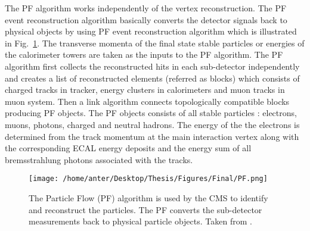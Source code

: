 The PF algorithm works independently of the vertex reconstruction. The PF event reconstruction algorithm basically converts the detector signals back to physical objects by using PF event reconstruction algorithm which is illustrated in Fig.~\ref{fig:PF_algo}. The transverse momenta of the final state stable particles or energies of the calorimeter towers are taken as the inputs to the PF algorithm. The PF algorithm first collects the reconstructed hits in each sub-detector independently and creates a list of reconstructed elements (referred as blocks) which consists of charged tracks in tracker, energy clusters in calorimeters and muon tracks in muon system. Then a link algorithm connects topologically compatible blocks producing PF objects. The PF objects consists of all stable particles : electrons, muons, photons, charged and neutral hadrons. The energy of the the electrons is determined from the track momentum at the main interaction vertex along with the corresponding ECAL energy deposits and the energy sum of all bremsstrahlung photons associated with the tracks. 
\begin{figure}[!t]
 \begin{center}
 \vspace*{4mm} 
 \texttt{[image: /home/anter/Desktop/Thesis/Figures/Final/PF.png]}
 \vspace*{5mm}
 \caption[The Particle Flow (PF) algorithm is used by the CMS to identify and reconstruct the particles. The PF converts the sub-detector measurements back to physical particle objects.]{The Particle Flow (PF) algorithm is used by the CMS to identify and reconstruct the particles. The PF converts the sub-detector measurements back to physical particle objects. Taken from \cite{Rabbertz:2017ssq}.}
 \label{fig:PF_algo}
 \end{center}
\end{figure}
